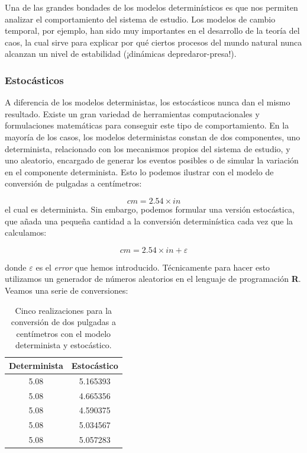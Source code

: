 \documentclass[
]{book}
\begin{document}
Una de las grandes bondades de los modelos determinísticos es que nos permiten analizar el comportamiento del sistema de estudio. Los modelos de cambio temporal, por ejemplo, han sido muy importantes en el desarrollo de la teoría del caos, la cual sirve para explicar por qué ciertos procesos del mundo natural nunca alcanzan un nivel de estabilidad (¡dinámicas depredaror-presa!).

\hypertarget{estocuxe1sticos}{%
\subsubsection{Estocásticos}\label{estocuxe1sticos}}

A diferencia de los modelos deterministas, los estocásticos nunca dan el mismo resultado. Existe un gran variedad de herramientas computacionales y formulaciones matemáticas para conseguir este tipo de comportamiento. En la mayoría de los casos, los modelos deterministas constan de dos componentes, uno determinista, relacionado con los mecanismos propios del sistema de estudio, y uno aleatorio, encargado de generar los eventos posibles o de simular la variación en el componente determinista. Esto lo podemos ilustrar con el modelo de conversión de pulgadas a centímetros:

\[
cm = 2.54 \times in
\]
el cual es determinista. Sin embargo, podemos formular una versión estocástica, que añada una pequeña cantidad a la conversión determinística cada vez que la calculamos:

\[
cm = 2.54 \times in + \varepsilon
\]

donde \(\varepsilon\) es el \emph{error} que hemos introducido. Técnicamente para hacer esto utilizamos un generador de números aleatorios en el lenguaje de programación \textbf{R}. Veamos una serie de conversiones:

\begin{table}

\caption{\label{tab:unnamed-chunk-35}Cinco realizaciones para la conversión de dos pulgadas a centímetros con el modelo determinista y estocástico.}
\centering
\begin{tabular}[t]{c|c}
\hline
Determinista & Estocástico\\
\hline
5.08 & 5.165393\\
\hline
5.08 & 4.665356\\
\hline
5.08 & 4.590375\\
\hline
5.08 & 5.034567\\
\hline
5.08 & 5.057283\\
\hline
\end{tabular}
\end{table}
\end{document}
